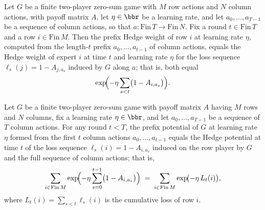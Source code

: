 \begin{lemma}
\label{prefixHedgeWeight_eq_hedgeWeight}
\leanok
{}
Let $G$ be a finite two-player zero-sum game with $M$ row actions and $N$ column
actions, with payoff matrix $A$, let $\eta \in \bbr$ be a learning rate, and let $a_0,
\dots, a_{T-1}$ be a sequence of column actions, so that $a : \mathrm{Fin}\,T \to
\mathrm{Fin}\,N$. Fix a round $t \in \mathrm{Fin}\,T$ and a row $i \in \mathrm{Fin}\,M$.
Then the prefix Hedge weight of row $i$ at learning rate $\eta$, computed from the
length-$t$ prefix $a_0, \dots, a_{t-1}$ of column actions, equals the Hedge weight of
expert $i$ at time $t$ and learning rate $\eta$ for the loss sequence $\ell_s(j) = 1 -
A_{j, a_s}$ induced by $G$ along $a$; that is, both equal
\[
  \exp\!\Bigl(-\eta \sum_{s < t} \bigl(1 - A_{i, a_s}\bigr)\Bigr).
\]
\end{lemma}

\begin{lemma}
\label{prefixPotential_eq_potential}
\leanok
{}
Let $G$ be a finite two-player zero-sum game with payoff matrix $A$ having $M$ rows and
$N$ columns, fix a learning rate $\eta \in \bbr$, and let $a_0, \dots, a_{T-1}$ be a
sequence of $T$ column actions. For any round $t < T$, the prefix potential of $G$ at
learning rate $\eta$ formed from the first $t$ column actions $a_0, \dots, a_{t-1}$
equals the Hedge potential at time $t$ of the loss sequence $\ell_s(i) = 1 - A_{i, a_s}$
induced on the row player by $G$ and the full sequence of column actions; that is, \[
\sum_{i \in \mathrm{Fin}\,M} \exp\!\Bigl(-\eta \sum_{s=0}^{t-1}\bigl(1 - A_{i,
a_s}\bigr)\Bigr) \;=\; \sum_{i \in \mathrm{Fin}\,M} \exp\!\bigl(-\eta\, L_t(i)\bigr), \]
where $L_t(i) = \sum_{s < t} \ell_s(i)$ is the cumulative loss of row $i$.
\end{lemma}

